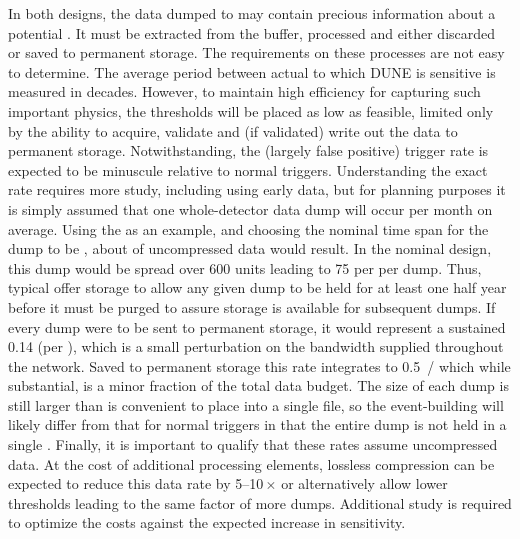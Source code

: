 In both designs, the data dumped to  may contain precious
information about a potential . 
It must be extracted from the buffer, processed and either discarded
or saved to permanent storage. 
The requirements on these processes are not easy to determine.
The average period between actual  to which DUNE is
sensitive is measured in decades. 
However, to maintain high efficiency for capturing such important
physics, the thresholds will be placed as low as feasible, limited
only by the ability to acquire, validate and (if validated) write out the
data to permanent storage. 
Notwithstanding, the (largely false positive)  trigger rate is
expected to be minuscule relative to normal triggers.
Understanding the exact rate requires more study, including using
early data, but for planning purposes it is simply assumed that one
whole-detector data dump will occur per month on average.
Using the  as an example, and choosing the
nominal time span for the dump to be \snbtime{}, about \spsnbsize of
uncompressed data would result.
In the nominal   design, this dump would be spread over
\num{600}  units leading to \SI{75}{\GB} per  per dump.
Thus, typical  offer storage to allow any given dump to be
held for at least one half year before it must be purged to assure
storage is available for subsequent dumps.
If every dump were to be sent to permanent storage, it would represent
a sustained \SI{0.14}{\Gbps} (per ), which is a small
perturbation on the bandwidth supplied throughout the  network. 
Saved to permanent storage this rate integrates to \SI{0.5}{\PB/\year}
which while substantial, is a minor fraction of the total data budget.
The size of each dump is still larger than is convenient to place into
a single file, so the  event-building will likely differ from
that for normal triggers in that the entire dump is not held in a
single . 
Finally, it is important to qualify that these rates assume
uncompressed data. 
At the cost of additional processing elements, lossless compression
can be expected to reduce this data rate by \numrange{5}{10}\,$\times$ or
alternatively allow lower thresholds leading to the same factor of %
more
dumps.
Additional study is required to optimize the costs against the expected
increase in sensitivity.


